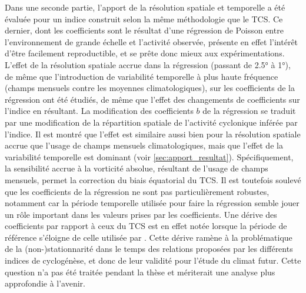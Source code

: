 \documentclass[../main.tex]{subfiles}
\begin{document}
Dans une seconde partie, l'apport de la résolution spatiale et temporelle a été évaluée pour un indice construit selon la même méthodologie que le TCS. Ce
dernier, dont les coefficients sont le résultat d'une régression de Poisson entre l'environnement de grande échelle et l'activité observée, présente en effet
l'intérêt d'être facilement reproductible, et se prête donc mieux aux expérimentations. L'effet de la résolution spatiale accrue dans la régression (passant de
\ang{2.5} à \ang{1}), de même que l'introduction de variabilité temporelle à plus haute fréquence (champs mensuels contre les moyennes climatologiques), sur les
coefficients de la régression ont été étudiés, de même que l'effet des changements de coefficients sur l'indice en résultant. La modification des coefficients
$b$ de la régression se traduit par une modification de la répartition spatiale de l'activité cyclonique inférée par l'indice. Il est montré que l'effet est
similaire aussi bien pour la résolution spatiale accrue que l'usage de champs mensuels climatologiques, mais que l'effet de la variabilité temporelle est
dominant (voir \cref{sec:apport_resultat}). Spécifiquement, la sensibilité accrue à la vorticité absolue, résultant de l'usage de champs mensuels, permet la
correction du biais équatorial du TCS. Il est toutefois soulevé que les coefficients de la régression ne sont pas particulièrement robustes, notamment car la
période temporelle utilisée pour faire la régression semble jouer un rôle important dans les valeurs prises par les coefficients. Une dérive des coefficients
par rapport à ceux du TCS est en effet notée lorsque la période de référence s'éloigne de celle utilisée par \textcite{tippett_poisson_2011}. Cette dérive
ramène à la problématique de la (non-)stationnarité dans le temps des relations proposées par les différents indices de cyclogénèse, et donc de leur validité
pour l'étude du climat futur. Cette question n'a pas été traitée pendant la thèse et mériterait une analyse plus approfondie à l'avenir.
\end{document}
